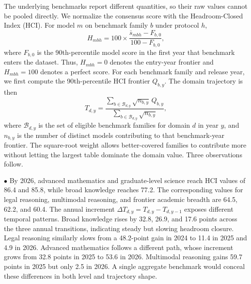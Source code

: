 The underlying benchmarks report different quantities, so their raw values cannot be pooled directly. We normalize the consensus score with the Headroom-Closed Index (HCI). For model $m$ on benchmark family $b$ under protocol $h$,
\begin{equation}
H_{mbh}=100\times\frac{\bar{s}_{mbh}-F_{b,0}}{100-F_{b,0}},
\label{eq:headroom-closed-index}
\end{equation}
where $F_{b,0}$ is the 90th-percentile model score in the first year that benchmark enters the dataset. Thus, $H_{mbh}=0$ denotes the entry-year frontier and $H_{mbh}=100$ denotes a perfect score. For each benchmark family and release year, we first compute the 90th-percentile HCI frontier $Q_{b,y}$. The domain trajectory is then
\begin{equation}
T_{d,y}=\frac{\sum_{b\in\mathcal{B}_{d,y}}\sqrt{n_{b,y}}\,Q_{b,y}}
{\sum_{b\in\mathcal{B}_{d,y}}\sqrt{n_{b,y}}},
\label{eq:domain-hci-trajectory}
\end{equation}
where $\mathcal{B}_{d,y}$ is the set of eligible benchmark families for domain $d$ in year $y$, and $n_{b,y}$ is the number of distinct models contributing to that benchmark-year frontier. The square-root weight allows better-covered families to contribute more without letting the largest table dominate the domain value. Three observations follow.

\noindent$\bullet$ 
By 2026, advanced mathematics and graduate-level science reach HCI values of 86.4 and 85.8, while broad knowledge reaches 77.2. The corresponding values for legal reasoning, multimodal reasoning, and frontier academic breadth are 64.5, 62.2, and 60.4. The annual increment $\Delta T_{d,y}=T_{d,y}-T_{d,y-1}$ exposes different temporal patterns. Broad knowledge rises by 32.8, 26.9, and 17.6 points across the three annual transitions, indicating steady but slowing headroom closure. Legal reasoning similarly slows from a 48.2-point gain in 2024 to 11.4 in 2025 and 4.9 in 2026. Advanced mathematics follows a different path, whose increment grows from 32.8 points in 2025 to 53.6 in 2026. Multimodal reasoning gains 59.7 points in 2025 but only 2.5 in 2026. A single aggregate benchmark would conceal these differences in both level and trajectory shape.

